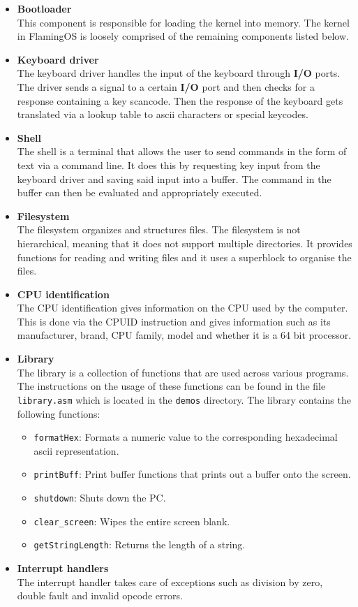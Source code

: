 \documentclass{article}
\begin{document}
\begin{itemize}

\item \textbf{Bootloader} \\
This component is responsible for loading the kernel into memory. The kernel in FlamingOS is loosely
comprised of the remaining components listed below.
\item \textbf{Keyboard driver} \\
The keyboard driver handles the input of the keyboard through \textbf{I/O} ports. The driver 
sends a signal to a certain \textbf{I/O} port and then checks for a response containing a key
scancode. Then the response of the keyboard gets translated via a lookup table to ascii characters
or special keycodes.
\item \textbf{Shell} \\
The shell is a terminal that allows the user to send commands in the form of text via a command
line. It does this by requesting key input from the keyboard driver and saving said input
into a buffer. The command in the buffer can then be evaluated and appropriately executed.
\item \textbf{Filesystem} \\
The filesystem organizes and structures files. The filesystem is not hierarchical, meaning
that it does not support multiple directories. It provides functions for reading and writing
files and it uses a superblock to organise the files.
\item \textbf{CPU identification} \\
The CPU identification gives information on the CPU used by the computer. This is done via the 
CPUID instruction and gives information such as its manufacturer, brand, CPU family, model and
whether it is a 64 bit processor.
\item \textbf{Library} \\
The library is a collection of functions that are used across various programs. The instructions
on the usage of these functions can be found in the file \texttt{library.asm} which is located
in the \texttt{demos} directory. The library contains the following functions: 
\begin{itemize}
\item \texttt{formatHex}: Formats a numeric value to the corresponding hexadecimal ascii representation.
\item \texttt{printBuff}: Print buffer functions that prints out a buffer onto the screen. 
\item \texttt{shutdown}: Shuts down the PC. 
\item \texttt{clear\_screen}: Wipes the entire screen blank.
\item \texttt{getStringLength}: Returns the length of a string.
\end{itemize}

\item \textbf{Interrupt handlers} \\
The interrupt handler takes care of exceptions such as division by zero, double fault
and invalid opcode errors.


\end{itemize}
\end{document}
